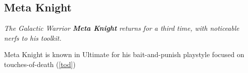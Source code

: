 \subsection{Meta Knight}
\emph{
	The Galactic Warrior \textbf{Meta Knight} returns for a third time, with noticeable nerfs to his toolkit.
}

Meta Knight is known in Ultimate for his bait-and-punish playstyle focused on touches-of-death (\ref{tod})






